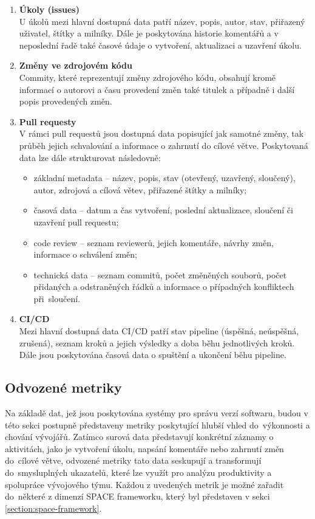 \begin{enumerate}
    \item \textbf{Úkoly (issues)}\\
    U úkolů mezi hlavní dostupná data patří název, popis, autor, stav, přiřazený uživatel, štítky a milníky. Dále je poskytována historie komentářů a v neposlední řadě také časové údaje o vytvoření, aktualizaci a uzavření úkolu.
    \item \textbf{Změny ve zdrojovém kódu}\\
    Commity, které reprezentují změny zdrojového kódu, obsahují kromě informací o autorovi a času provedení změn také titulek a případně i další popis provedených změn.
    \item \textbf{Pull requesty}\\
    V rámci pull requestů jsou dostupná data popisující jak samotné změny, tak průběh jejich schvalování a informace o zahrnutí do cílové větve. Poskytovaná data lze dále strukturovat následovně:
    \begin{itemize}[topsep=0pt, itemsep=2pt]
        \item základní metadata -- název, popis, stav (otevřený, uzavřený, sloučený), autor, zdrojová a cílová větev, přiřazené štítky a milníky;
        \item časová data -- datum a čas vytvoření, poslední aktualizace, sloučení či uzavření pull requestu;
        \item code review -- seznam reviewerů, jejich komentáře, návrhy změn, informace o schválení změn;
        \item technická data -- seznam commitů, počet změněných souborů, počet přidaných a odstraněných řádků a informace o případných konfliktech při~sloučení.
    \end{itemize}

    \item \textbf{CI/CD}\\
    Mezi hlavní dostupná data CI/CD patří stav pipeline (úspěšná, neúspěšná, zrušená), seznam kroků a jejich výsledky a doba běhu jednotlivých kroků. Dále jsou poskytována časová data o spuštění a ukončení běhu pipeline.
\end{enumerate}

\subsection{Odvozené metriky}
Na základě dat, jež jsou poskytována systémy pro správu verzí softwaru, budou v této sekci postupně představeny metriky poskytující hlubší vhled do~výkonnosti a chování vývojářů. Zatímco surová data představují konkrétní záznamy o aktivitách, jako je vytvoření úkolu, napsání komentáře nebo zahrnutí změn do~cílové větve, odvozené metriky tato data seskupují a transformují do~smysluplných ukazatelů, které lze využít pro analýzu produktivity a spolupráce vývojového týmu. Každou z uvedených metrik je možné zařadit do~některé z dimenzí SPACE frameworku, který byl představen v sekci \ref{section:space-framework}.


